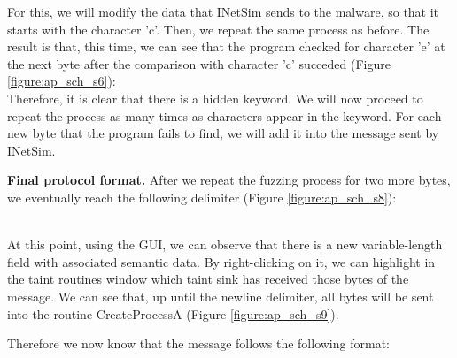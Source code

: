 \documentclass[conference]{IEEEtran}
\begin{document}
For this, we will modify the data that INetSim sends to the malware, so that it
starts with the character 'c'. Then, we repeat the same process as before. The
result is that, this time, we can see that the program checked for character
'e' at the next byte after the comparison with character 'c' succeded (Figure
\ref{figure:ap_sch_s6}): \noindent{}\\%

Therefore, it is clear that there is a hidden keyword. We will now proceed to
repeat the process as many times as characters appear in the keyword. For each
new byte that the program fails to find, we will add it into the message sent
by INetSim.

\textbf{Final protocol format.}
After we repeat the fuzzing process for two more bytes, we eventually reach the following delimiter (Figure \ref{figure:ap_sch_s8}):

\noindent{}\\%

At this point, using the GUI, we can observe that there is a new
variable-length field with associated semantic data. By right-clicking on it,
we can highlight in the taint routines window which taint sink has received
those bytes of the message. We can see that, up until the newline delimiter,
all bytes will be sent into the routine CreateProcessA (Figure
\ref{figure:ap_sch_s9}).

Therefore we now know that the message follows the following format:

\noindent{}\\%
\end{document}

